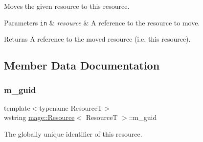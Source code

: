 Moves the given resource to this resource.


\begin{DoxyParams}[1]{Parameters}
\mbox{\tt in}  & {\em resource} & A reference to the resource to move. \\
\hline
\end{DoxyParams}
\begin{DoxyReturn}{Returns}
A reference to the moved resource (i.\+e. this resource). 
\end{DoxyReturn}


\subsection{Member Data Documentation}
\mbox{\label{classmage_1_1_resource_ac8cf21b8b48c47a104110e12e259ad99}} 
\subsubsection{\texorpdfstring{m\+\_\+guid}{m\_guid}}
{\footnotesize\ttfamily template$<$typename ResourceT$>$ \\
wstring \mbox{\hyperlink{classmage_1_1_resource}{mage\+::\+Resource}}$<$ ResourceT $>$\+::m\+\_\+guid\hspace{0.3cm}{\ttfamily [private]}}

The globally unique identifier of this resource. 